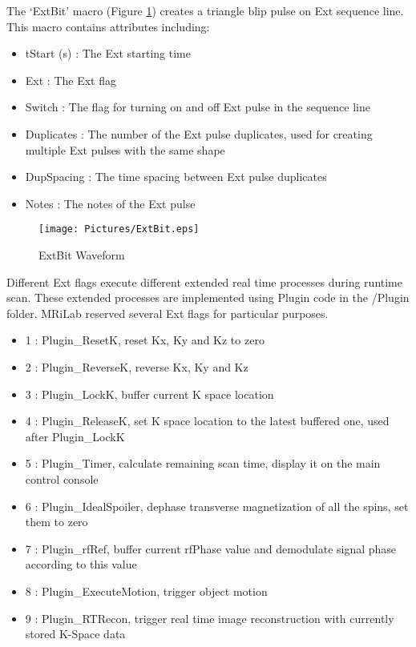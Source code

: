 \documentclass{book}%
\begin{document}
The `ExtBit' macro (Figure \ref{fig:ExtBit}) creates a triangle blip pulse on Ext sequence line. This macro contains attributes including:

\begin{itemize}
	\item tStart (s) : The Ext starting time
	\item Ext : The Ext flag
	\item Switch : The flag for turning on and off Ext pulse in the sequence line
	\item Duplicates : The number of the Ext pulse duplicates, used for creating multiple Ext pulses with the same shape
	\item DupSpacing : The time spacing between Ext pulse duplicates
	\item Notes : The notes of the Ext pulse 
\end{itemize}

\begin{figure}[htbp]
	\centering
		\texttt{[image: Pictures/ExtBit.eps]}
	\caption{ExtBit Waveform}
	\label{fig:ExtBit}
\end{figure}


Different Ext flags execute different extended real time processes during runtime scan. These extended processes are implemented using Plugin code in the /Plugin folder. MRiLab reserved several Ext flags for particular purposes. 

\begin{itemize}
	\item 1 : Plugin\_ResetK, reset Kx, Ky and Kz to zero
	\item 2 : Plugin\_ReverseK, reverse Kx, Ky and Kz
	\item 3 : Plugin\_LockK, buffer current K space location
	\item 4 : Plugin\_ReleaseK, set K space location to the latest buffered one, used after Plugin\_LockK
	\item 5 : Plugin\_Timer, calculate remaining scan time, display it on the main control console
	\item 6 : Plugin\_IdealSpoiler, dephase transverse magnetization of all the spins, set them to zero
	\item 7 : Plugin\_rfRef, buffer current rfPhase value and demodulate signal phase according to this value
	\item 8 : Plugin\_ExecuteMotion, trigger object motion
	\item 9 : Plugin\_RTRecon, trigger real time image reconstruction with currently stored K-Space data
\end{itemize}
\end{document}

